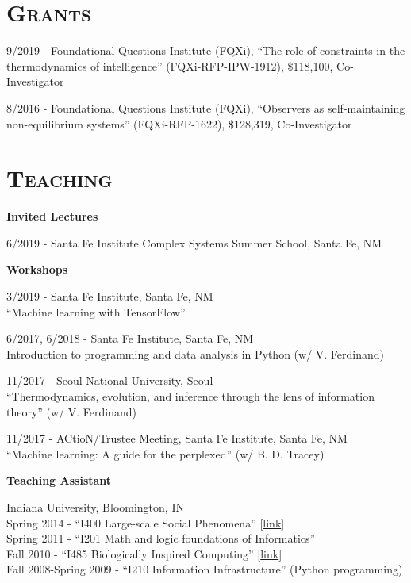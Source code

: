 \documentclass[margin,line,centered]{res}
\begin{document}
\begin{resume}


\section{\textsc{Grants}}
9/2019 - Foundational Questions Institute (FQXi), 
``The role of constraints in the thermodynamics of intelligence'' (FQXi-RFP-IPW-1912),
\$118,100, Co-Investigator

8/2016 - Foundational Questions Institute (FQXi), 
``Observers as self-maintaining non-equilibrium systems'' (FQXi-RFP-1622),
\$128,319, Co-Investigator


\section{\textsc{Teaching}}

\textbf{Invited Lectures}

6/2019 - Santa Fe Institute Complex Systems Summer School, Santa Fe, NM

\vspace{5pt}

\textbf{Workshops}

3/2019 - Santa Fe Institute, Santa Fe, NM\\
``Machine learning with TensorFlow''

6/2017, 6/2018 - Santa Fe Institute, Santa Fe, NM\\
Introduction to programming and data analysis in Python (w/ V. Ferdinand)

11/2017 - Seoul National University, Seoul \\
``Thermodynamics, evolution, and inference through the lens of information theory'' (w/ V. Ferdinand)

11/2017 - ACtioN/Trustee Meeting, Santa Fe Institute, Santa Fe, NM\\
``Machine learning: A guide for the perplexed'' (w/ B. D. Tracey)


\vspace{5pt}

\textbf{Teaching Assistant}

Indiana University, Bloomington, IN\\
\hangindent=10pt Spring 2014 - ``I400 Large-scale Social Phenomena'' {[}\href{http://tuvalu.santafe.edu/~simon/page11/page11.html}{link}{]} \\
Spring 2011 - ``I201 Math and logic foundations of Informatics''\\
Fall 2010 - ``I485 Biologically Inspired Computing'' {[}\href{http://www.informatics.indiana.edu/rocha/i-bic/}{link}{]}\\
Fall 2008-Spring 2009 - ``I210 Information Infrastructure'' (Python programming)


\end{resume}
\end{document}
